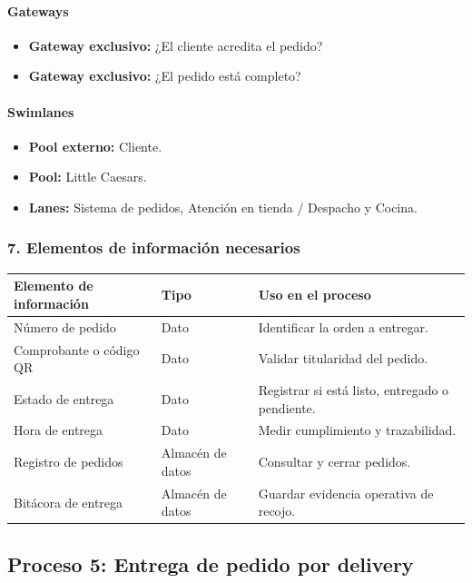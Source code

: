 \documentclass[a4paper,12pt]{article}
\begin{document}
\paragraph{Gateways}

\begin{itemize}
    \item \textbf{Gateway exclusivo:} ¿El cliente acredita el pedido?
    \item \textbf{Gateway exclusivo:} ¿El pedido está completo?
\end{itemize}

\paragraph{Swimlanes}

\begin{itemize}
    \item \textbf{Pool externo:} Cliente.
    \item \textbf{Pool:} Little Caesars.
    \item \textbf{Lanes:} Sistema de pedidos, Atención en tienda / Despacho y Cocina.
\end{itemize}

\subsubsection*{7. Elementos de información necesarios}

\begin{longtable}{P{5cm} P{5cm} P{4cm}}
\toprule
\textbf{Elemento de información} & \textbf{Tipo} & \textbf{Uso en el proceso} \\
\midrule
Número de pedido & Dato & Identificar la orden a entregar. \\
Comprobante o código QR & Dato & Validar titularidad del pedido. \\
Estado de entrega & Dato & Registrar si está listo, entregado o pendiente. \\
Hora de entrega & Dato & Medir cumplimiento y trazabilidad. \\
Registro de pedidos & Almacén de datos & Consultar y cerrar pedidos. \\
Bitácora de entrega & Almacén de datos & Guardar evidencia operativa de recojo. \\
\bottomrule
\end{longtable}

\subsection*{Proceso 5: Entrega de pedido por delivery}
\end{document}
